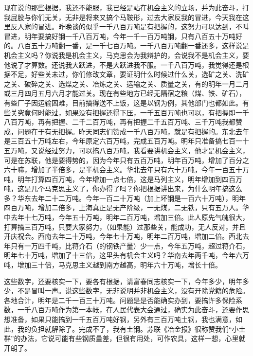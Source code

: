 现在说的那些根据，我还不能服，我已经是站在机会主义的立场，并为此奋斗，打我屁股与你们无关，无非是将来又搞个马鞍形，过去大家反我的冒进，今天我在这里反人家的冒进。昨晚谈的似乎一千八百万吨是有把握的，这努力可以达到，不叫冒进，明年要搞好钢一千八百万吨，今年一千一百万吨钢，只有八百五十万吨好的。八百五十万吨翻一番，是一千七百万吨。一千八百万吨翻一番还多，这样说是机会主义吗？你说我是机会主义，马克思会为我辩护的，会说我不是机会主义，要他说了才算数。还说我大跃进，不是大跃进我不服。一千八百万吨，我觉得还是根据不足，好些关未过，你们修改文章，要证明什么时候过什么关，选矿之关、洗矿之关、破碎之关、选煤之关、冶炼之关、运输之关、质量之关，有的明年一月二月或三月四月五月六月才能过关。现在有些地方已经无隔宿之粮（煤、铁、矿石），有些厂子因运输困难，目前搞得送不上饭，这是以钢为例，其他部门也都如此。有些关究竟何时能过，如果没有把握还得下压，一千五百万吨也可以，有把握即一千八百万吨，再有把握、二千二百万吨，再有把握二千五百万吨、三千万吨我都赞成，问题在于有无把握。昨天同志们赞成一千八百万吨，就是有把握的。东北去年是三百五十万吨左右，今年原定六百万吨，完成五百万吨。明年只准备搞七百一十五万吨，又说经过努力，可以搞八百万吨，我看要讲机会主义，他才是机会主义，可是在苏联，他是要得势的，因为今年只有五百万吨，明年百万吨，增加了百分之六十嘛，增加了半倍多，是半机会主义。华北去年只有六十万吨，今年一百五十万吨，明年打算四百万吨，今年增加一点七倍，这是马列主义，明年增加到四百万吨，这是几个马克思主义了，你办得了吗？你把根据讲出来，为什么明年搞这么多？华东去年二十二万吨。今年一百二十万吨（加上坏钢是一百六十万吨），明年四百万吨，增加二倍多，上海真正是无产阶级，一无煤，二无铁，只有五万人。华中去年十七万吨，今年五十万吨，明年二百万吨，增加三倍。此人原先气魄很大，打算搞三百万吨，只要大家努力，（如果能）过那些关，能成功，无人反对，并且开庆祝会。西南去年二十万吨，今年七十万吨，明年二百万吨，增加二倍。西北去年只有一万四千吨，比蒋介石（的钢铁产量）少一点，今年五万吨，超过蒋介石，明年七十万吨，增加了十三倍，这里头有机会主义吗？华南去年两千吨，今年六万吨，增加三十倍，马克思主义越到南方越高，明年六十万吨，增长十倍。

这些数字，还要核实一下，要各有根据，请富春同志核实一下，今年多少，明年多少，不是冒叫一声。说这些数字，无非说明并非机会主义，没有开除党籍的危险。各地合计，明年是二千一百三十万吨。问题是是否能确实办到，要搞许多保险系数，一千八百万吨作为第一本帐，在人民代表大会通过，确实为此奋斗，还要作思想准备，如果只能搞到一千五百万吨好钢，另外有三百万吨土钢，我也满意，如此，我的负担就解除了。完成不了，我有土钢。苏联《冶金报》很称赞我们“小土群”的办法，它说可能有些钢质量差，但很有用处，可作农具，这样一想，心里就开朗了。


